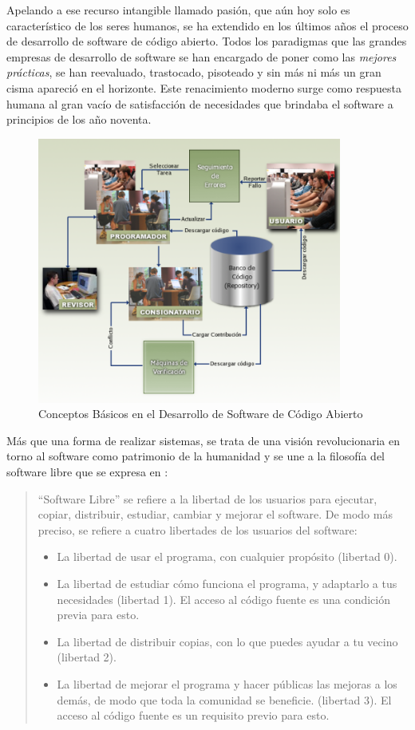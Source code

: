 Apelando a ese recurso intangible llamado pasión, que aún hoy solo es característico de los seres humanos, se ha extendido en los últimos años el proceso de desarrollo de software de código abierto. Todos los paradigmas que las grandes empresas de desarrollo de software se han encargado de poner como las \textit{mejores prácticas}, se han reevaluado, trastocado, pisoteado y sin más ni más un gran cisma apareció en el horizonte. Este renacimiento moderno surge como respuesta humana al gran vacío de satisfacción de necesidades que brindaba el software a principios de los año noventa.

\begin{figure}
 \centering
 \includegraphics[width=100mm]{proceso_fs.png}
 \caption{Conceptos Básicos en el Desarrollo de Software de Código Abierto}
\label{proceso_fs} 
\end{figure}

Más que una forma de realizar sistemas, se trata de una visión revolucionaria en torno al software como patrimonio de la humanidad y se une a la filosofía del software libre que se expresa en \cite{stallman2002}:

\begin{quote}
“Software Libre” se refiere a la libertad de los usuarios para ejecutar, copiar, distribuir, estudiar, cambiar y mejorar el software. De modo más preciso, se refiere a cuatro libertades de los usuarios del software:

\begin{itemize}
\item La libertad de usar el programa, con cualquier propósito (libertad 0).
\item La libertad de estudiar cómo funciona el programa, y adaptarlo a tus necesidades (libertad 1). El acceso al código fuente es una condición previa para esto.
\item La libertad de distribuir copias, con lo que puedes ayudar a tu vecino (libertad 2).
\item La libertad de mejorar el programa y hacer públicas las mejoras a los demás, de modo que toda la comunidad se beneficie. (libertad 3). El acceso al código fuente es un requisito previo para esto.
\end{itemize}
\end{quote} 

